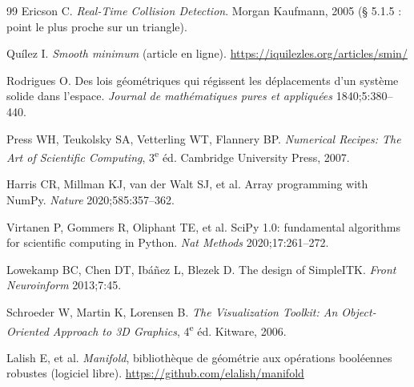 \begin{thebibliography}{99}
 Ericson C. \emph{Real-Time Collision Detection}. Morgan Kaufmann, 2005 (§ 5.1.5 : point le plus
proche sur un triangle).

 Quílez I. \emph{Smooth minimum} (article en ligne). \url{https://iquilezles.org/articles/smin/}

 Rodrigues O. Des lois géométriques qui régissent les déplacements d'un système solide dans
l'espace. \emph{Journal de mathématiques pures et appliquées} 1840;5:380--440.

 Press WH, Teukolsky SA, Vetterling WT, Flannery BP. \emph{Numerical Recipes: The Art of
Scientific Computing}, 3\textsuperscript{e} éd. Cambridge University Press, 2007.

 Harris CR, Millman KJ, van der Walt SJ, et al. Array programming with NumPy. \emph{Nature}
2020;585:357--362.

 Virtanen P, Gommers R, Oliphant TE, et al. SciPy 1.0: fundamental algorithms for scientific
computing in Python. \emph{Nat Methods} 2020;17:261--272.

 Lowekamp BC, Chen DT, Ibáñez L, Blezek D. The design of SimpleITK. \emph{Front Neuroinform}
2013;7:45.

 Schroeder W, Martin K, Lorensen B. \emph{The Visualization Toolkit: An Object-Oriented
Approach to 3D Graphics}, 4\textsuperscript{e} éd. Kitware, 2006.

 Lalish E, et al. \emph{Manifold}, bibliothèque de géométrie aux opérations booléennes robustes
(logiciel libre). \url{https://github.com/elalish/manifold}

\end{thebibliography}
